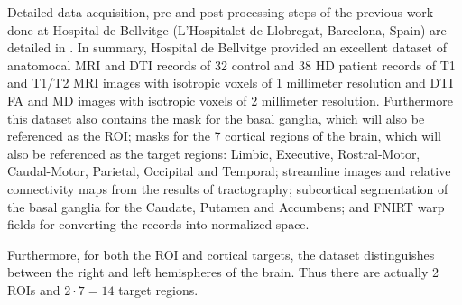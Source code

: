 Detailed data acquisition, pre and post processing steps of the previous work done at Hospital de Bellvitge (L'Hospitalet de Llobregat, Barcelona, Spain) are detailed in . In summary, Hospital de Bellvitge provided an excellent dataset of anatomocal \ac{MRI} and \ac{DTI} records of 32 control and 38 \ac{HD} patient records of T1 and T1/T2 \ac{MRI} images with isotropic voxels of 1 millimeter resolution and \ac{DTI} \ac{FA} and \ac{MD} images with isotropic voxels of 2 millimeter resolution. Furthermore this dataset also contains the mask for the basal ganglia, which will also be referenced as the \ac{ROI}; masks for the 7 cortical regions of the brain, which will also be referenced as the target regions: Limbic, Executive, Rostral-Motor, Caudal-Motor, Parietal, Occipital and Temporal; streamline images and relative connectivity maps from the results of tractography; subcortical segmentation of the basal ganglia for the Caudate, Putamen and Accumbens; and \ac{FNIRT} warp fields for converting the records into normalized space.\par
Furthermore, for both the \ac{ROI} and cortical targets, the dataset distinguishes between the right and left hemispheres of the brain. Thus there are actually 2 \ac{ROI}s and $2 \cdot 7=14$ target regions.

